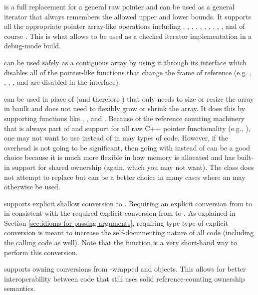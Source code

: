 \documentclass[pdf,ps2pdf,11pt]{SANDreport}
\begin{document}
{} is a full replacement for a general raw pointer and can be
used as a general iterator that always remembers the allowed upper and lower
bounds.  It supports all the appropriate pointer array-like operations
including {}, {}, {}, {},
{}, , {}, {}, {},
{}, and of course {}.  This is what allows
{} to be used as a checked iterator implementation in a
debug-mode build.

{} can be used safely as a contiguous array by using it through
its {} interface which disables all of the pointer-like functions
that change the frame of reference (e.g. {}, {}, ,
{}, and {} are disabled in the {} interface).

{} can be used in place of {} (and therefore
{}) that only needs to size or resize the array in baulk and does
not need to flexibly grow or shrink the array.  It does this by supporting
functions like {}, {}, and {}.
Because of the reference counting machinery that is always part of
{} and support for all raw C++ pointer functionality (e.g.,
{}), one may not want to use {} instead of
{} in may types of code.  However, if the overhead is not going to
be significant, then going with {} instead of {} can
be a good choice because it is much more flexible in how memory is allocated
and has built-in support for shared ownership (again, which you may not want).
The class {} does not attempt to replace {} but can
be a better choice in many cases where an {} may otherwise be used.

{} supports explicit shallow conversion to {}.
Requiring an explicit conversion from {} to {} in
consistent with the required explicit conversion from {} to
{}.  As explained in Section
{}\ref{sec:idioms-for-passing-arguments}, requiring type type of explicit
conversion is meant to increase the self-documenting nature of all code
(including the calling code as well).  Note that the
{} function is a very short-hand way to perform
this conversion.

{} supports owning conversions from
{}-wrapped {} and {}
objects.  This allows for better interoperability between code that
still uses solid reference-counting ownership semantics.
\end{document}
